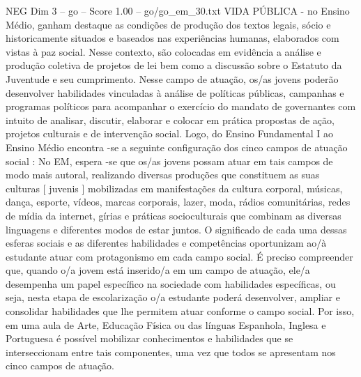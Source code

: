 \begin{textsample}{NEG Dim 3 – go – Score 1.00 – go/go\_em\_30.txt}
VIDA PÚBLICA - no Ensino Médio, ganham destaque as condições de produção dos textos legais, sócio e historicamente situados e baseados nas experiências humanas, elaborados com vistas à paz social.
Nesse contexto, são colocadas em evidência a análise e produção coletiva de projetos de lei bem como a discussão sobre o Estatuto da Juventude e seu cumprimento.
Nesse campo de atuação, os/as jovens poderão desenvolver habilidades vinculadas à análise de políticas públicas, campanhas e programas políticos para acompanhar o exercício do mandato de governantes com intuito de analisar, discutir, elaborar e colocar em prática propostas de ação, projetos culturais e de intervenção social.
Logo, do Ensino Fundamental I ao Ensino Médio encontra -se a seguinte configuração dos cinco campos de atuação social : No EM, espera -se que os/as jovens possam atuar em tais campos de modo mais autoral, realizando diversas produções que constituem as suas culturas [ juvenis ] mobilizadas em manifestações da cultura corporal, músicas, dança, esporte, vídeos, marcas corporais, lazer, moda, rádios comunitárias, redes de mídia da internet, gírias e práticas socioculturais que combinam as diversas linguagens e diferentes modos de estar juntos.
O significado de cada uma dessas esferas sociais e as diferentes habilidades e competências oportunizam ao/à estudante atuar com protagonismo em cada campo social.
É preciso compreender que, quando o/a jovem está inserido/a em um campo de atuação, ele/a desempenha um papel específico na sociedade com habilidades específicas, ou seja, nesta etapa de escolarização o/a estudante poderá desenvolver, ampliar e consolidar habilidades que lhe permitem atuar conforme o campo social.
Por isso, em uma aula de Arte, Educação Física ou das línguas Espanhola, Inglesa e Portuguesa é possível mobilizar conhecimentos e habilidades que se interseccionam entre tais componentes, uma vez que todos se apresentam nos cinco campos de atuação.

\end{textsample}
